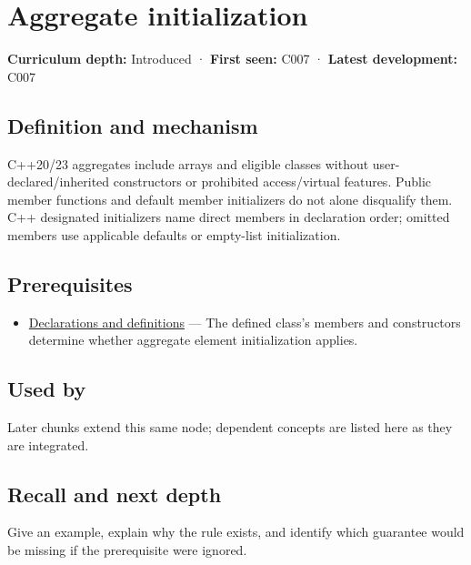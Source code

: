 \hypertarget{appendix-b7174c179542}{}
\section{Aggregate initialization}\label{appendix-b7174c179542-aggregate-initialization}

\textbf{Curriculum depth:} Introduced · \textbf{First seen:} C007 · \textbf{Latest development:} C007

\subsection{Definition and mechanism}\label{appendix-b7174c179542-definition-and-mechanism}

C++20/23 aggregates include arrays and eligible classes without user-declared/inherited constructors or prohibited access/virtual features. Public member functions and default member initializers do not alone disqualify them. C++ designated initializers name direct members in declaration order; omitted members use applicable defaults or empty-list initialization.

\subsection{Prerequisites}\label{appendix-b7174c179542-prerequisites}

\begin{itemize}
\tightlist
\item
  \hyperref[appendix-2e4d494c2d94]{Declarations and definitions} --- The defined class's members and constructors determine whether aggregate element initialization applies.
\end{itemize}

\subsection{Used by}\label{appendix-b7174c179542-used-by}

Later chunks extend this same node; dependent concepts are listed here as they are integrated.

\subsection{Recall and next depth}\label{appendix-b7174c179542-recall-and-next-depth}

Give an example, explain why the rule exists, and identify which guarantee would be missing if the prerequisite were ignored.

